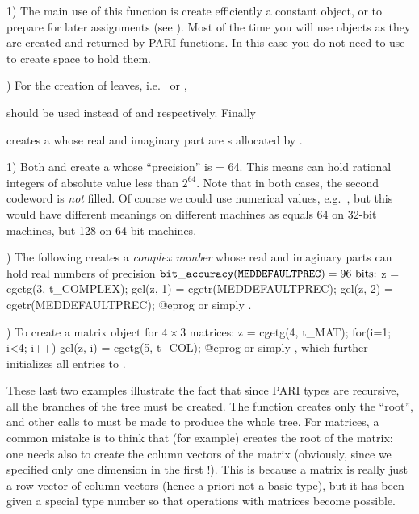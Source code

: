  1)  The main use of this function is create efficiently
a constant object, or to prepare for later assignments (see
). Most of the time you will use  objects as they
are created and returned by PARI functions. In this case you do not need to
use  to create space to hold them.

) For the creation of leaves, i.e.~ or ,



\noindent should be used instead of  and
 respectively. Finally


\noindent creates a  whose real and imaginary part are
s allocated by .

 1) Both  and
 create a  whose ``precision'' is
 = 64. This means  can hold rational
integers of absolute value less than $2^{64}$. Note that in both cases, the
second codeword is \emph{not} filled. Of course we could use numerical
values, e.g.~, but this would have different meanings on
different machines as  equals 64 on 32-bit machines,
but 128 on 64-bit machines.

) The following creates a \emph{complex number} whose real and
imaginary parts can hold real numbers of precision
${\tt bit\_accuracy(MEDDEFAULTPREC)} = 96\hbox{ bits:}$
%
\bprog
  z = cgetg(3, t_COMPLEX);
  gel(z, 1) = cgetr(MEDDEFAULTPREC);
  gel(z, 2) = cgetr(MEDDEFAULTPREC);
@eprog\noindent
or simply .

) To create a matrix object for $4\times 3$ matrices:
%
\bprog
  z = cgetg(4, t_MAT);
  for(i=1; i<4; i++) gel(z, i) = cgetg(5, t_COL);
@eprog\noindent
or simply , which further initializes all entries
to .

These last two examples illustrate the fact that since PARI types are
recursive, all the branches of the tree must be created. The function
 creates only the ``root'', and other calls to  must be
made to produce the whole tree. For matrices, a common mistake is to think
that  (for example) creates the root of the
matrix: one needs also to create the column vectors of the matrix (obviously,
since we specified only one dimension in the first !). This is
because a matrix is really just a row vector of column vectors (hence a
priori not a basic type), but it has been given a special type number so that
operations with matrices become possible.

